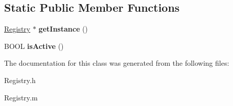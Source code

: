 \subsection*{\-Static \-Public \-Member \-Functions}
\begin{DoxyCompactItemize}
\item 
\hypertarget{interface_registry_ad01a89fc6097d3a71f5ed5fbae0e038e}{
\hyperlink{interface_registry}{\-Registry} $\ast$ {\bfseries get\-Instance} ()}
\label{interface_registry_ad01a89fc6097d3a71f5ed5fbae0e038e}

\item 
\hypertarget{interface_registry_a2d16855f6989111b6119c0827d0a3a4e}{
\-B\-O\-O\-L {\bfseries is\-Active} ()}
\label{interface_registry_a2d16855f6989111b6119c0827d0a3a4e}

\end{DoxyCompactItemize}


\-The documentation for this class was generated from the following files\-:\begin{DoxyCompactItemize}
\item 
\-Registry.\-h\item 
\-Registry.\-m\end{DoxyCompactItemize}
